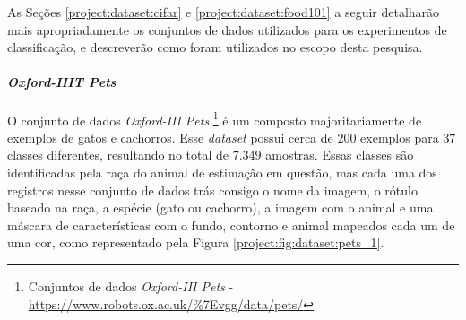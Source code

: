 As Seções \ref{project:dataset:cifar} e \ref{project:dataset:food101} a seguir detalharão mais apropriadamente os conjuntos de dados utilizados para os experimentos de classificação, e descreverão como foram utilizados no escopo desta pesquisa.

\paragraph{\textit{Oxford-IIIT Pets}}
\label{project:dataset:pets}

O conjunto de dados \textit{Oxford-III Pets} \footnote{Conjuntos de dados \textit{Oxford-III Pets} - \url{https://www.robots.ox.ac.uk/\%7Evgg/data/pets/}} \citep{Parkhi2012CatsDogs} é um composto majoritariamente de exemplos de gatos e cachorros. Esse \textit{dataset} possui cerca de $200$ exemplos para $37$ classes diferentes, resultando no total de $7.349$ amostras. Essas classes são identificadas pela raça do animal de estimação em questão, mas cada uma dos registros nesse conjunto de dados trás consigo o nome da imagem, o rótulo baseado na raça, a espécie (gato ou cachorro), a imagem com o animal e uma máscara de características com o fundo, contorno e animal mapeados cada um de uma cor, como representado pela Figura \ref{project:fig:dataset:pets_1}.

